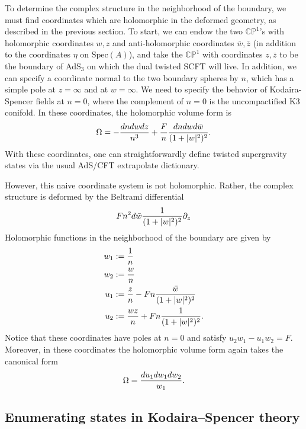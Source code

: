 \documentclass[../main.tex]{subfiles}
\begin{document}
To determine the complex structure in the neighborhood of the boundary, we must find coordinates which are holomorphic in the deformed geometry, as described in the previous section. To start, we can endow the two $\mathbb{CP}^1$'s with holomorphic coordinates $w, z$ and anti-holomorphic coordinates $\bar{w}, \bar{z}$ (in addition to the coordinates $\eta$ on $\textrm{Spec}(A)$), and take the $\mathbb{CP}^1$ with coordinates $z, \bar{z}$ to be the boundary of AdS$_3$ on which the dual twisted SCFT will live. In addition, we can specify a coordinate normal to the two boundary spheres by $n$, which has a simple pole at $z=\infty$ and at $w = \infty$. We need to specify the behavior of Kodaira-Spencer fields at $n=0$, where the complement of $n=0$ is the uncompactified K3 conifold. In these coordinates, the holomorphic volume form is 
\begin{equation}
\Omega = -{dn dw dz \over n^3} + {F \over n}{dn dw d\bar{w} \over (1 + |w|^2)^2}.
\end{equation} With these coordinates, one can straightforwardly define twisted supergravity states via the usual AdS/CFT extrapolate dictionary. 

However, this naive coordinate system is not holomorphic. Rather, the complex structure is deformed by the Beltrami differential
\begin{equation}
F n^2 d\bar{w}{1 \over (1 + |w|^2)^2}\partial_z
\end{equation}
Holomorphic functions in the neighborhood of the boundary are given by 
\begin{align}
w_1&:= {1 \over n} \\
w_2&:={w \over n} \\
u_1&:={z \over n} - F n {\bar{w} \over (1 + |w|^2)^2} \\
u_2&:={w z \over n} + F n {1 \over (1 + |w|^2)^2}.
\end{align}
Notice that these coordinates have poles at $n=0$ and satisfy $u_2 w_1 - u_1 w_2 = F$. Moreover, in these coordinates the holomorphic volume form again takes the canonical form
\begin{equation}
\Omega = {du_1 dw_1 dw_2 \over w_1}.
\end{equation}




\subsection{Enumerating states in Kodaira--Spencer theory}
\end{document}
